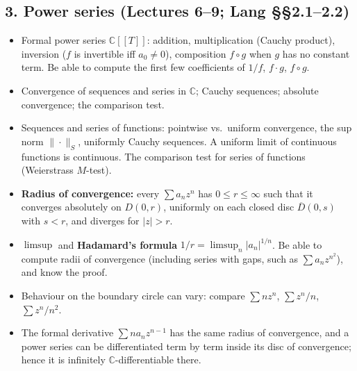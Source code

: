\documentclass[12pt, reqno]{amsart}
\theoremstyle{definition}
\numberwithin{equation}{subsection}
\newcommand{\C}{\mathbb{C}}
\newcommand{\ov}[1]{\overline{#1}}
\begin{document}
\subsection*{3. Power series \normalfont (Lectures 6--9; Lang \S\S2.1--2.2)}
\begin{itemize}[leftmargin=*]
\item Formal power series $\C[[T]]$: addition, multiplication (Cauchy product),
      inversion ($f$ is invertible iff $a_0\ne0$), composition $f\circ g$ when $g$ has no constant term.
      Be able to compute the first few coefficients of $1/f$, $f\cdot g$, $f\circ g$.
\item Convergence of sequences and series in $\C$; Cauchy sequences; absolute convergence; the comparison test.
\item Sequences and series of functions: pointwise vs.\ uniform convergence, the sup norm $\|\cdot\|_S$,
      uniformly Cauchy sequences. A uniform limit of continuous functions is continuous.
      The comparison test for series of functions (Weierstrass $M$-test).
\item \textbf{Radius of convergence:} every $\sum a_nz^n$ has $0\le r\le\infty$ such that it converges absolutely
      on $D(0,r)$, uniformly on each closed disc $\ov D(0,s)$ with $s<r$, and diverges for $|z|>r$.
\item $\limsup$ and \textbf{Hadamard's formula} $1/r=\limsup_n|a_n|^{1/n}$. Be able to compute radii of convergence
      (including series with gaps, such as $\sum a_nz^{n^2}$), and know the proof.
\item Behaviour on the boundary circle can vary: compare $\sum nz^n$, $\sum z^n/n$, $\sum z^n/n^2$.
\item The formal derivative $\sum na_nz^{n-1}$ has the same radius of convergence, and a power series can be
      differentiated term by term inside its disc of convergence; hence it is infinitely $\C$-differentiable there.
\end{itemize}
\end{document}
